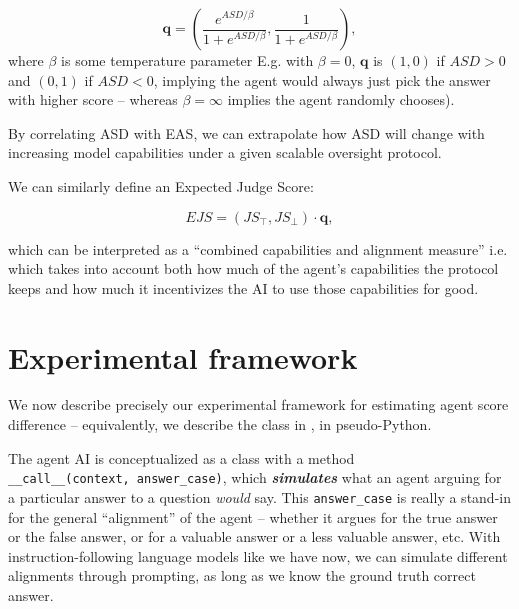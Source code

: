 \[\mathbf{q}=\left(\frac{e^{ASD/\beta}}{1+e^{ASD/\beta}}, \frac{1}{1+e^{ASD/\beta}}\right),\] where \(\beta\) is some temperature parameter E.g. with \(\beta=0\), $\mathbf{q}$ is $(1,0)$ if $ASD>0$ and $(0,1)$ if $ASD<0$, implying the agent would always just pick the answer with higher score -- whereas \(\beta=\infty\) implies the agent randomly chooses).

By correlating ASD with EAS, we can extrapolate how ASD will change with increasing model capabilities under a given scalable oversight protocol.

We can similarly define an Expected Judge Score:

\[EJS=(JS_\top,JS_\bot)\cdot\mathbf{q},\]

which can be interpreted as a ``combined capabilities and alignment measure'' i.e. which takes into account both how much of the agent's capabilities the protocol keeps and how much it incentivizes the AI to use those capabilities for good.

\section{Experimental framework}
\label{solib:sec:formal}

We now describe precisely our experimental framework for estimating agent score difference -- equivalently, we describe the \Protocol{} class in \solib{}, in pseudo-Python.

The agent AI is conceptualized as a class \Agent{} with a method \texttt{\_\_call\_\_(context,\ answer\_case)}, which \textbf{\emph{simulates}} what an agent arguing for a particular answer to a question \emph{would} say. This \texttt{answer\_case} is really a stand-in for the general ``alignment'' of the agent -- whether it argues for the true answer or the false answer, or for a valuable answer or a less valuable answer, etc. With instruction-following language models like we have now, we can simulate different alignments through prompting, as long as we know the ground truth correct answer.




